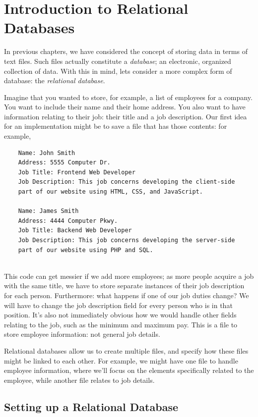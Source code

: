 \documentclass[oneside, openany] {book}
\begin{document}
\chapter{Introduction to Relational Databases}
\minitoc
{}
In previous chapters, we have considered the concept of storing data in terms of text files. Such files actually constitute a \emph{database}; an electronic, organized collection of data.
With this in mind, lets consider a more complex form of database: the \emph{relational database}.

Imagine that you wanted to store, for example, a list of employees for a company. You want to include their name and their home address. You also want to have information relating to their job: their title and a job description. Our first idea for an implementation might be to save a file that has those contents: for example,

\begin{verbatim}
    Name: John Smith
    Address: 5555 Computer Dr.
    Job Title: Frontend Web Developer
    Job Description: This job concerns developing the client-side
    part of our website using HTML, CSS, and JavaScript.
    
    Name: James Smith
    Address: 4444 Computer Pkwy.
    Job Title: Backend Web Developer
    Job Description: This job concerns developing the server-side 
    part of our website using PHP and SQL.
    
\end{verbatim}
This code can get messier if we add more employees; as more people acquire a job with the same title, we have to store separate instances of their job description for each person. Furthermore: what happens if one of our job duties change? We will have to change the job description field for every person who is in that position. It's also not immediately obvious how we would handle other fields relating to the job, such as the minimum and maximum pay. This is a file to store employee information: not general job details.

Relational databases allow us to create multiple files, and specify how these files might be linked to each other. For example, we might have one file to handle employee information, where we'll focus on the elements specifically related to the employee, while another file relates to job details.

\section{Setting up a Relational Database}
\end{document}
